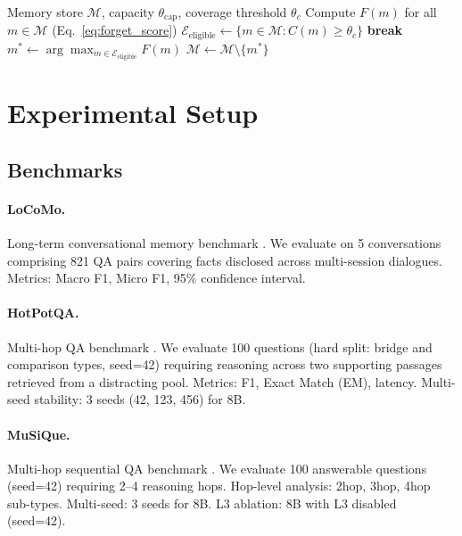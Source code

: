 \documentclass{article}
\begin{document}
\begin{algorithm}[h]
\caption{Consolidation-Aware Forgetting (CA-Ours)}
\label{alg:ca_forgetting}
\begin{algorithmic}[1]
\REQUIRE Memory store $\mathcal{M}$, capacity $\theta_{\text{cap}}$, coverage threshold $\theta_c$
  \STATE Compute $F(m)$ for all $m \in \mathcal{M}$ (Eq.~\ref{eq:forget_score})
  \STATE $\mathcal{E}_{\text{eligible}} \leftarrow \{m \in \mathcal{M} : C(m) \geq \theta_c\}$
    \STATE \textbf{break} \quad {}
  \ENDIF
  \STATE $m^* \leftarrow \arg\max_{m \in \mathcal{E}_{\text{eligible}}} F(m)$
  \STATE $\mathcal{M} \leftarrow \mathcal{M} \setminus \{m^*\}$
\ENDWHILE
\end{algorithmic}
\end{algorithm}

\section{Experimental Setup}
\label{sec:setup}

\subsection{Benchmarks}

\paragraph{LoCoMo.}
Long-term conversational memory benchmark \citep{maharana2024locomo}.  We
evaluate on 5 conversations comprising 821 QA pairs covering facts disclosed
across multi-session dialogues.  Metrics: Macro F1, Micro F1, 95\% confidence
interval.

\paragraph{HotPotQA.}
Multi-hop QA benchmark \citep{yang2018hotpotqa}.  We evaluate 100 questions
(hard split: bridge and comparison types, seed=42) requiring reasoning across
two supporting passages retrieved from a distracting pool.  Metrics: F1, Exact
Match (EM), latency.  Multi-seed stability: 3 seeds (42, 123, 456) for 8B.

\paragraph{MuSiQue.}
Multi-hop sequential QA benchmark \citep{trivedi2022musique}.  We evaluate
100 answerable questions (seed=42) requiring 2–4 reasoning hops.  Hop-level
analysis: 2hop, 3hop, 4hop sub-types.  Multi-seed: 3 seeds for 8B.
L3 ablation: 8B with L3 disabled (seed=42).
\end{document}
